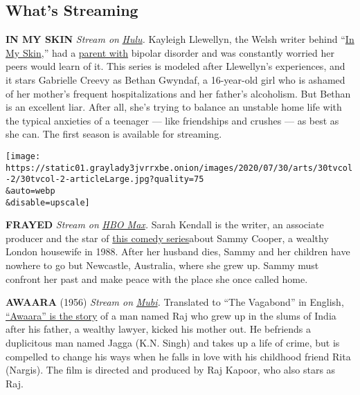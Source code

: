 \hypertarget{whats-streaming}{%
\subsection{What's Streaming}\label{whats-streaming}}

\textbf{IN MY SKIN} \emph{Stream on}
\href{https://www.hulu.com/series/in-my-skin-91be18aa-30c6-40bf-b191-74503708b305}{\emph{Hulu}}\emph{.}
Kayleigh Llewellyn, the Welsh writer behind
``\href{https://www.nytimes3xbfgragh.onion/2020/06/01/arts/television/june-netflix.html}{In
My Skin},'' had a
\href{https://www.theguardian.com/tv-and-radio/2020/mar/29/kayleigh-llewellyn-in-my-skin-interview-bipolar-disorder-mum}{parent
with} bipolar disorder and was constantly worried her peers would learn
of it. This series is modeled after Llewellyn's experiences, and it
stars Gabrielle Creevy as Bethan Gwyndaf, a 16-year-old girl who is
ashamed of her mother's frequent hospitalizations and her father's
alcoholism. But Bethan is an excellent liar. After all, she's trying to
balance an unstable home life with the typical anxieties of a teenager
--- like friendships and crushes --- as best as she can. The first
season is available for streaming.

\texttt{[image: https://static01.graylady3jvrrxbe.onion/images/2020/07/30/arts/30tvcol-2/30tvcol-2-articleLarge.jpg?quality=75\\\&auto=webp\\\&disable=upscale]}

\textbf{FRAYED} \emph{Stream on}
\href{https://www.hbomax.com/coming-soon/frayed}{\emph{HBO Max}}\emph{.}
Sarah Kendall is the writer, an associate producer and the star of
\href{https://tv.avclub.com/hbo-max-s-frayed-tells-several-coming-of-age-stories-b-1844460359}{this
comedy series}about Sammy Cooper, a wealthy London housewife in 1988.
After her husband dies, Sammy and her children have nowhere to go but
Newcastle, Australia, where she grew up. Sammy must confront her past
and make peace with the place she once called home.

\textbf{AWAARA} (1956) \emph{Stream on}
\href{https://mubi.com/films/the-vagabond-1951}{\emph{Mubi}}\emph{.}
Translated to ``The Vagabond'' in English,
\href{https://www.nytimes3xbfgragh.onion/1956/04/16/archives/screen-an-indian-import-the-vagabond-opens-at-cameo-theatre.html}{``Awaara''
is the story} of a man named Raj who grew up in the slums of India after
his father, a wealthy lawyer, kicked his mother out. He befriends a
duplicitous man named Jagga (K.N. Singh) and takes up a life of crime,
but is compelled to change his ways when he falls in love with his
childhood friend Rita (Nargis). The film is directed and produced by Raj
Kapoor, who also stars as Raj.

